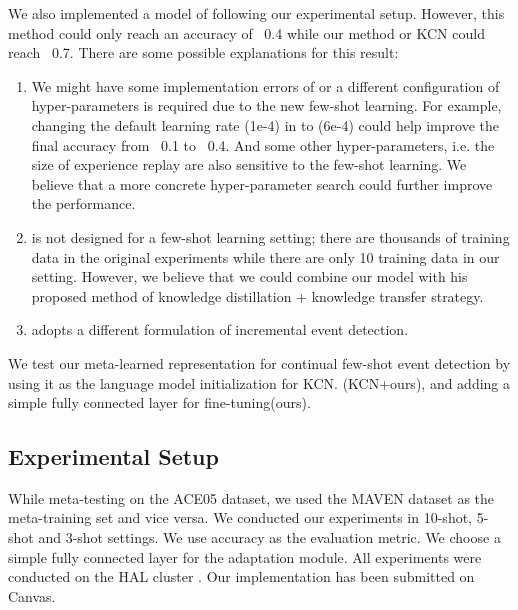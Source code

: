 We also implemented a model of  \cite{yu2021lifelong} following our experimental setup. However, this method could only reach an accuracy of ~0.4 while our method or KCN could reach ~0.7. There are some possible explanations for this result: 
\begin{enumerate}[noitemsep]
\item We might have some implementation errors of  \cite{yu2021lifelong} or a different configuration of hyper-parameters is required due to the new few-shot learning. For example, changing the default learning rate (1e-4)  in  \cite{yu2021lifelong}  to (6e-4) could help improve the final accuracy from ~0.1 to ~0.4. And some other hyper-parameters, i.e. the size of experience replay are also sensitive to the few-shot learning. We believe that a more concrete hyper-parameter search could further improve the performance. 

\item \cite{yu2021lifelong}  is not designed for a few-shot learning setting; there are thousands of  training data in the original experiments while there are only 10 training data in our setting. However, we believe that we could combine our model with his proposed method of knowledge distillation + knowledge transfer strategy. 

\item \cite{yu2021lifelong} adopts a different formulation of incremental event detection.
\end{enumerate}

We test our meta-learned representation for continual few-shot event detection by using it as the language model initialization for KCN. (KCN+ours), and adding a simple fully connected layer for fine-tuning(ours). 

\subsection{Experimental Setup}
While meta-testing on the ACE05 dataset, we used the MAVEN dataset as the meta-training set and vice versa.  We conducted our experiments in 10-shot, 5-shot and 3-shot settings.  We use accuracy as the evaluation metric. We choose a simple fully connected layer for the adaptation module.  All experiments were conducted on the HAL cluster \citep{HAL}. Our implementation has been submitted on Canvas. 

